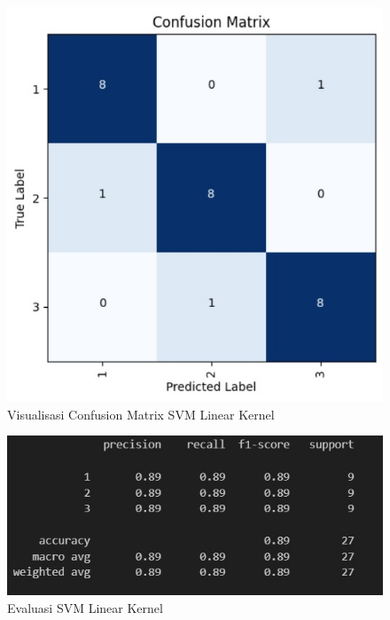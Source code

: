 \begin{figure} [H] \centering
  \includegraphics[scale=0.65]{gambar/cfplinear.jpg}
  \caption{Visualisasi Confusion Matrix SVM Linear Kernel}
  \label{fig:evalcfplinearkernel}
\end{figure}

\begin{figure} [H] \centering
  \includegraphics[scale=0.65]{gambar/EvalLinear.jpg}
  \caption{Evaluasi SVM Linear Kernel}
  \label{fig:evallinearkernel}
\end{figure}



